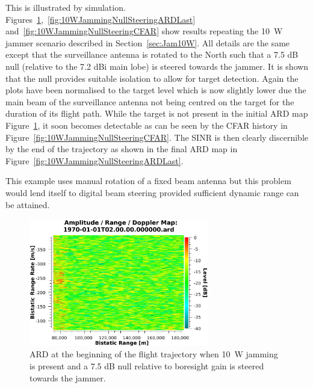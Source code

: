 \documentclass[english, 12pt]{report}
\begin{document}
This is illustrated by simulation. Figures~\ref{fig:10WJammingNullSteeringARDFirst},~\ref{fig:10WJammingNullSteeringARDLast} and~\ref{fig:10WJammingNullSteeringCFAR} show results repeating the 10~W jammer scenario described in Section~\ref{sec:Jam10W}. All details are the same except that the surveillance antenna is rotated to the North such that a 7.5 dB null (relative to the 7.2 dBi main lobe) is steered towards the jammer. It is shown that the null provides suitable isolation to allow for target detection. Again the plots have been normalised to the target level which is now slightly lower due the main beam of the surveillance antenna not being centred on the target for the duration of its flight path. While the target is not present in the initial ARD map Figure~\ref{fig:10WJammingNullSteeringARDFirst}, it soon becomes detectable as can be seen by the CFAR history in Figure~\ref{fig:10WJammingNullSteeringCFAR}. The SINR is then clearly discernible by the end of the trajectory as shown in the final ARD map in Figure~\ref{fig:10WJammingNullSteeringARDLast}.

This example uses manual rotation of a fixed beam antenna but this problem would lend itself to digital beam steering provided sufficient dynamic range can be attained.

\begin{figure}[htbp]
\begin{center}
\includegraphics[width=0.7\textwidth]{figs/Simulations/10WJammingNullSteeringARDFirst.pdf}
\caption[ARD with modest null towards jammer.]{ARD at the beginning of the flight trajectory when 10~W jamming is present and a 7.5 dB null relative to boresight gain is steered towards the jammer.}
\label{fig:10WJammingNullSteeringARDFirst}
\end{center}
\end{figure}
\end{document}
